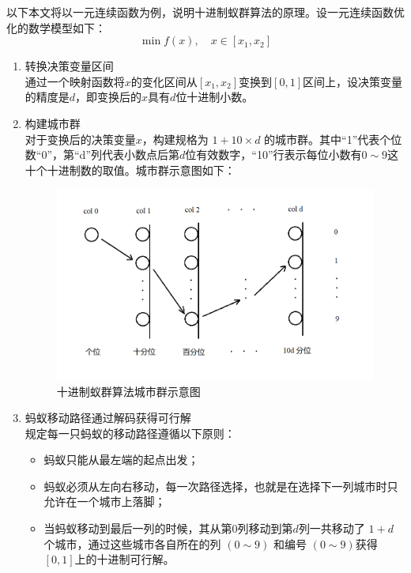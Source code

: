 \documentclass[../main.tex]{subfiles}
\begin{document}
以下本文将以一元连续函数为例，说明十进制蚁群算法的原理。设一元连续函数优化的数学模型如下：
\begin{equation}
\min f(x), \quad x \in [x_1 , x_2]
\end{equation}
%
\begin{enumerate}
	\item 转换决策变量区间\\
	通过一个映射函数将\(x\)的变化区间从\([x_1,x_2]\)变换到\([0,1]\)区间上，设决策变量的精度是\(d\)，即变换后的\(x\)具有\(d\)位十进制小数。
	\smallskip
	\item 构建城市群\\
	对于变换后的决策变量\(x\)，构建规格为 \(1+10\times d\) 的城市群。其中``1''代表个位数``0''，第``d''列代表小数点后第\(d\)位有效数字，``10''行表示每位小数有\(0 {\sim} 9\)这十个十进制数的取值。城市群示意图如下：
	\smallskip
	\begin{figure}[H]
	\centering
	\includegraphics[scale = 0.5]{cities.png}
	\caption{十进制蚁群算法城市群示意图}\label{fig:cities}
	\end{figure}
	\item 蚂蚁移动路径通过解码获得可行解\\
	规定每一只蚂蚁的移动路径遵循以下原则：
	\begin{itemize}
		\item 蚂蚁只能从最左端的起点出发；
		\item 蚂蚁必须从左向右移动，每一次路径选择，也就是在选择下一列城市时只允许在一个城市上落脚；
		\item 当蚂蚁移动到最后一列的时候，其从第0列移动到第\(d\)列一共移动了 \(1 + d\) 个城市，通过这些城市各自所在的列 \((0 {\sim} 9)\) 和编号 \(( 0 {\sim} 9)\)获得 \([0,1]\)上的十进制可行解。
	\end{itemize}

\end{enumerate}
\end{document}
